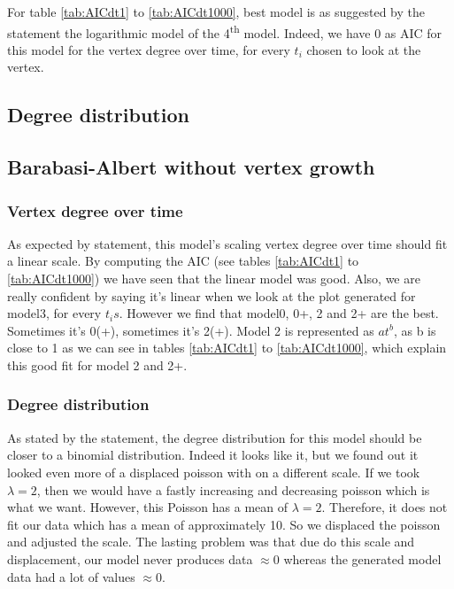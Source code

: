 \documentclass{article}
\begin{document}
For table \ref{tab:AICdt1} to \ref{tab:AICdt1000}, best model is as suggested by
the statement the logarithmic model of the 4\textsuperscript{th} model. Indeed,
we have 0 as AIC for this model for the vertex degree over time, for every 
$t_i$ chosen to look at the vertex.

\subsection{Degree distribution}


\subsection{Barabasi-Albert without vertex growth}

\subsubsection{Vertex degree over time}

As expected by statement, this model's scaling vertex degree over time should
fit a linear scale. By computing the AIC (see tables \ref{tab:AICdt1} to
\ref{tab:AICdt1000}) we have seen that the linear model was good. Also, we are
really confident by saying it's linear when we look at the plot generated for
model3, for every $t_is$. However we find that model0, 0+, 2 and 2+ are the
best. Sometimes it's 0(+), sometimes it's 2(+). Model 2 is represented as
$at^b$, as b is close to 1 as we can see in tables \ref{tab:AICdt1} to
\ref{tab:AICdt1000}, which explain this good fit for model 2 and 2+.

\subsubsection{Degree distribution}

As stated by the statement, the degree distribution for this model should be
closer to a binomial distribution. Indeed it looks like it, but we found out it
looked even more of a displaced poisson with on a different scale. If we took
$\lambda = 2$, then we would have a fastly increasing and decreasing poisson
which is what we want. However, this Poisson has a mean of $\lambda = 2$.
Therefore, it does not fit our data which has a mean of approximately 10.
So we displaced the poisson and adjusted the scale. The lasting problem was that
due do this scale and displacement, our model never produces data $\approx 0$
whereas the generated model data had a lot of values $\approx 0$.
\end{document}

